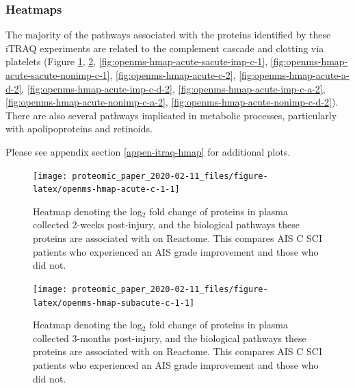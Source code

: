 \documentclass[
]{article}
\begin{document}
\hypertarget{heatmaps-chap3}{%
\subsubsection{Heatmaps}\label{heatmaps-chap3}}

The majority of the pathways associated with the proteins identified by these iTRAQ experiments are related to the complement cascade and clotting via platelets (Figure \ref{fig:openms-hmap-acute-c-1}, \ref{fig:openms-hmap-subacute-c-1}, \ref{fig:openms-hmap-acute-sacute-imp-c-1}, \ref{fig:openms-hmap-acute-sacute-nonimp-c-1}, \ref{fig:openms-hmap-acute-c-2}, \ref{fig:openms-hmap-acute-a-d-2}, \ref{fig:openms-hmap-acute-imp-c-d-2}, \ref{fig:openms-hmap-acute-imp-c-a-2}, \ref{fig:openms-hmap-acute-nonimp-c-a-2}, \ref{fig:openms-hmap-acute-nonimp-c-d-2}).
There are also several pathways implicated in metabolic processes, particularly with apolipoproteins and retinoids.

Please see appendix section \ref{appen-itraq-hmap} for additional plots.

\begin{SidewaysFigure}



\begin{figure}

{\centering \texttt{[image: proteomic\_paper\_2020-02-11\_files/figure-latex/openms-hmap-acute-c-1-1]} 

}

\caption{Heatmap denoting the log$_2$ fold change of proteins in plasma collected 2-weeks post-injury, and the biological pathways these proteins are associated with on Reactome. This compares AIS C SCI patients who experienced an AIS grade improvement and those who did not.}\label{fig:openms-hmap-acute-c-1}
\end{figure}

\end{SidewaysFigure}
\begin{SidewaysFigure}



\begin{figure}

{\centering \texttt{[image: proteomic\_paper\_2020-02-11\_files/figure-latex/openms-hmap-subacute-c-1-1]} 

}

\caption{Heatmap denoting the log$_2$ fold change of proteins in plasma collected 3-months post-injury, and the biological pathways these proteins are associated with on Reactome. This compares AIS C SCI patients who experienced an AIS grade improvement and those who did not.}\label{fig:openms-hmap-subacute-c-1}
\end{figure}

\end{SidewaysFigure}
\clearpage
\end{document}
